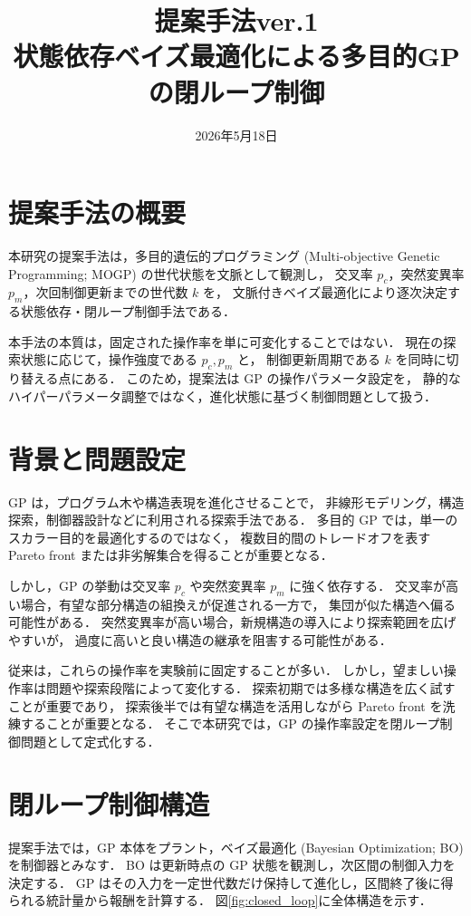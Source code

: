 \documentclass[a4paper,11pt]{ltjsarticle}
\title{提案手法ver.1\\状態依存ベイズ最適化による多目的GPの閉ループ制御}
\author{}
\date{2026年5月18日}
\begin{document}
\maketitle

\section{提案手法の概要}

本研究の提案手法は，多目的遺伝的プログラミング
(Multi-objective Genetic Programming; MOGP) の世代状態を文脈として観測し，
交叉率 \(p_c\)，突然変異率 \(p_m\)，次回制御更新までの世代数 \(k\) を，
文脈付きベイズ最適化により逐次決定する状態依存・閉ループ制御手法である．

本手法の本質は，固定された操作率を単に可変化することではない．
現在の探索状態に応じて，操作強度である \(p_c,p_m\) と，
制御更新周期である \(k\) を同時に切り替える点にある．
このため，提案法は GP の操作パラメータ設定を，
静的なハイパーパラメータ調整ではなく，進化状態に基づく制御問題として扱う．

\section{背景と問題設定}

GP は，プログラム木や構造表現を進化させることで，
非線形モデリング，構造探索，制御器設計などに利用される探索手法である．
多目的 GP では，単一のスカラー目的を最適化するのではなく，
複数目的間のトレードオフを表す Pareto front または非劣解集合を得ることが重要となる．

しかし，GP の挙動は交叉率 \(p_c\) や突然変異率 \(p_m\) に強く依存する．
交叉率が高い場合，有望な部分構造の組換えが促進される一方で，
集団が似た構造へ偏る可能性がある．
突然変異率が高い場合，新規構造の導入により探索範囲を広げやすいが，
過度に高いと良い構造の継承を阻害する可能性がある．

従来は，これらの操作率を実験前に固定することが多い．
しかし，望ましい操作率は問題や探索段階によって変化する．
探索初期では多様な構造を広く試すことが重要であり，
探索後半では有望な構造を活用しながら Pareto front を洗練することが重要となる．
そこで本研究では，GP の操作率設定を閉ループ制御問題として定式化する．

\section{閉ループ制御構造}

提案手法では，GP 本体をプラント，ベイズ最適化
(Bayesian Optimization; BO) を制御器とみなす．
BO は更新時点の GP 状態を観測し，次区間の制御入力を決定する．
GP はその入力を一定世代数だけ保持して進化し，区間終了後に得られる統計量から報酬を計算する．
図\ref{fig:closed_loop}に全体構造を示す．
\end{document}
